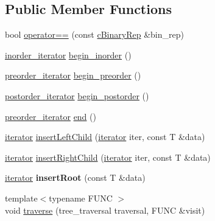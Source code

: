 \subsection*{\-Public \-Member \-Functions}
\begin{DoxyCompactItemize}
\item 
bool \hyperlink{classtree_1_1cBinaryRep_a7a8f861470cb8538aa03ddbb9cbac6af}{operator==} (const \hyperlink{classtree_1_1cBinaryRep}{c\-Binary\-Rep} \&bin\-\_\-rep)
\item 
\hyperlink{classtree_1_1btree__inorder__iterator}{inorder\-\_\-iterator} \hyperlink{classtree_1_1cBinaryRep_a5701848a04cd825236bc125b33e376d8}{begin\-\_\-inorder} ()
\item 
\hyperlink{classtree_1_1btree__preorder__iterator}{preorder\-\_\-iterator} \hyperlink{classtree_1_1cBinaryRep_a6e912be346d3626156df92eabecee012}{begin\-\_\-preorder} ()
\item 
\hyperlink{classtree_1_1btree__postorder__iterator}{postorder\-\_\-iterator} \hyperlink{classtree_1_1cBinaryRep_a99f4029023bc6b07fade450aceb2f17d}{begin\-\_\-postorder} ()
\item 
\hyperlink{classtree_1_1btree__preorder__iterator}{preorder\-\_\-iterator} \hyperlink{classtree_1_1cBinaryRep_acf645e7e2447eb801c71ac752ecede22}{end} ()
\item 
\hyperlink{classtree_1_1btree__iterator}{iterator} \hyperlink{classtree_1_1cBinaryRep_a1bd7a582b25b1f7a4ff76ea936377458}{insert\-Left\-Child} (\hyperlink{classtree_1_1btree__iterator}{iterator} iter, const \-T \&data)
\item 
\hyperlink{classtree_1_1btree__iterator}{iterator} \hyperlink{classtree_1_1cBinaryRep_a593596cea8e60e85a0f66fb3354617a8}{insert\-Right\-Child} (\hyperlink{classtree_1_1btree__iterator}{iterator} iter, const \-T \&data)
\item 
\hypertarget{classtree_1_1cBinaryRep_aae971b4e02baaa0c4d51ce1416ca2178}{\hyperlink{classtree_1_1btree__iterator}{iterator} {\bfseries insert\-Root} (const \-T \&data)}\label{classtree_1_1cBinaryRep_aae971b4e02baaa0c4d51ce1416ca2178}

\item 
{\footnotesize template$<$typename F\-U\-N\-C $>$ }\\void \hyperlink{classtree_1_1cBinaryRep_aebf973eb7334a5cf2134a51ebc519d33}{traverse} (tree\-\_\-traversal traversal, \-F\-U\-N\-C \&visit)
\end{DoxyCompactItemize}
